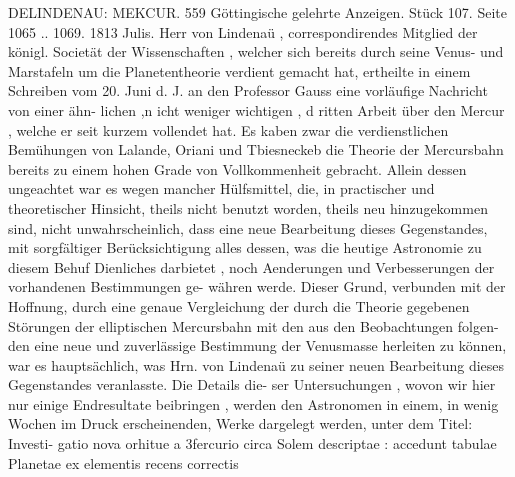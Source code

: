 \documentclass[12pt,a4paper]{article}
\begin{document}
\newpage
DELINDENAU: MEKCUR. 559\newline
Göttingische gelehrte Anzeigen. Stück 107. Seite 1065 .. 1069. 1813 Julis.\newline
Herr von Lindenaü , correspondirendes Mitglied der königl. Societät der Wissenschaften , welcher\newline
sich bereits durch seine Venus- und Marstafeln um die Planetentheorie verdient gemacht hat, ertheilte\newline
in einem Schreiben vom 20. Juni d. J. an den Professor Gauss eine vorläufige Nachricht von einer ähn-\newline
lichen ,n icht weniger wichtigen , d ritten Arbeit über den Mercur , welche er seit kurzem vollendet hat.\newline
Es kaben zwar die verdienstlichen Bemühungen von Lalande, Oriani und Tbiesneckeb die Theorie der\newline
Mercursbahn bereits zu einem hohen Grade von Vollkommenheit gebracht. Allein dessen ungeachtet\newline
war es wegen mancher Hülfsmittel, die, in practischer und theoretischer Hinsicht, theils nicht benutzt\newline
worden, theils neu hinzugekommen sind, nicht unwahrscheinlich, dass eine neue Bearbeitung dieses\newline
Gegenstandes, mit sorgfältiger Berücksichtigung alles dessen, was die heutige Astronomie zu diesem\newline
Behuf Dienliches darbietet , noch Aenderungen und Verbesserungen der vorhandenen Bestimmungen ge-\newline
währen werde. Dieser Grund, verbunden mit der Hoffnung, durch eine genaue Vergleichung der durch\newline
die Theorie gegebenen Störungen der elliptischen Mercursbahn mit den aus den Beobachtungen folgen-\newline
den eine neue und zuverlässige Bestimmung der Venusmasse herleiten zu können, war es hauptsächlich,\newline
was Hrn. von Lindenaü zu seiner neuen Bearbeitung dieses Gegenstandes veranlasste. Die Details die-\newline
ser Untersuchungen , wovon wir hier nur einige Endresultate beibringen , werden den Astronomen in\newline
einem, in wenig Wochen im Druck erscheinenden, Werke dargelegt werden, unter dem Titel: Investi-\newline
gatio nova orhitue a 3fercurio circa Solem descriptae : accedunt tabulae Planetae ex elementis recens correctis\newline
\end{document}
